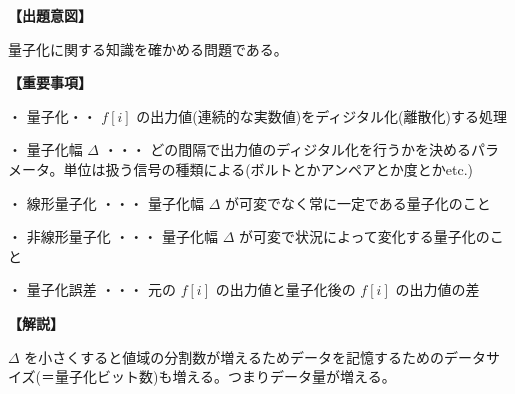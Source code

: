 \noindent \textbf{【出題意図】}

\noindent 量子化に関する知識を確かめる問題である。

\vspace{1em}
\noindent \textbf{【重要事項】}

\medskip
\noindent ・ 量子化・・ $f[i]$ の出力値(連続的な実数値)をディジタル化(離散化)する処理

\medskip
\noindent ・ 量子化幅 $\Delta$ ・・・ どの間隔で出力値のディジタル化を行うかを決めるパラメータ。単位は扱う信号の種類による(ボルトとかアンペアとか度とかetc.)

\medskip
\noindent ・ 線形量子化 ・・・ 量子化幅  $\Delta$ が可変でなく常に一定である量子化のこと

\medskip
\noindent ・ 非線形量子化 ・・・ 量子化幅  $\Delta$ が可変で状況によって変化する量子化のこと

\medskip
\noindent ・ 量子化誤差 ・・・ 元の $f[i]$ の出力値と量子化後の $f[i]$ の出力値の差

\vspace{1em}
\noindent \textbf{【解説】}

\noindent $\Delta$ を小さくすると値域の分割数が増えるためデータを記憶するためのデータサイズ(＝量子化ビット数)も増える。つまりデータ量が増える。
